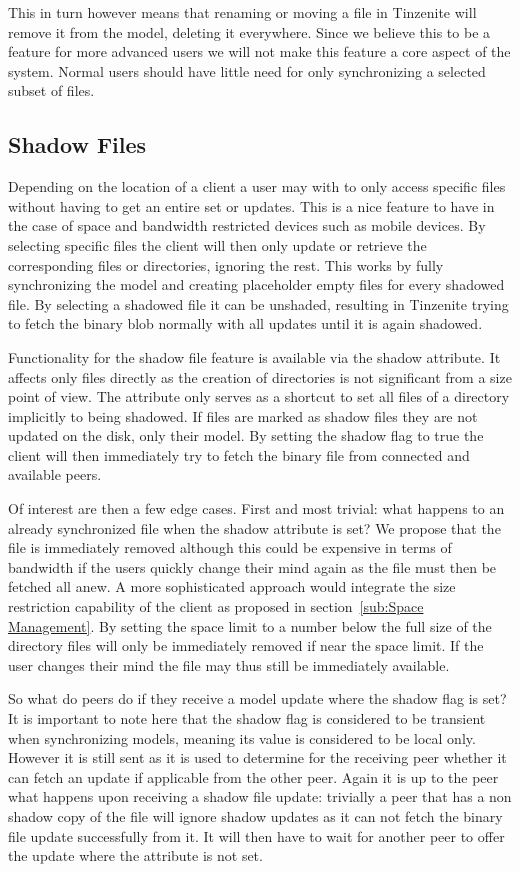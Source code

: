 This in turn however means that renaming or moving a file in Tinzenite will remove it from the model, deleting it everywhere.
Since we believe this to be a feature for more advanced users we will not make this feature a core aspect of the system.
Normal users should have little need for only synchronizing a selected subset of files.

\subsection{Shadow Files}
\label{sub:Shadow Files}

Depending on the location of a client a user may with to only access specific files without having to get an entire set or updates.
This is a nice feature to have in the case of space and bandwidth restricted devices such as mobile devices.
By selecting specific files the client will then only update or retrieve the corresponding files or directories, ignoring the rest.
This works by fully synchronizing the model and creating placeholder empty files for every shadowed file.
By selecting a shadowed file it can be unshaded, resulting in Tinzenite trying to fetch the binary blob normally with all updates until it is again shadowed.

Functionality for the shadow file feature is available via the shadow attribute.
It affects only files directly as the creation of directories is not significant from a size point of view.
The attribute only serves as a shortcut to set all files of a directory implicitly to being shadowed.
If files are marked as shadow files they are not updated on the disk, only their model.
By setting the shadow flag to true the client will then immediately try to fetch the binary file from connected and available peers.

Of interest are then a few edge cases.
First and most trivial: what happens to an already synchronized file when the shadow attribute is set?
We propose that the file is immediately removed although this could be expensive in terms of bandwidth if the users quickly change their mind again as the file must then be fetched all anew.
A more sophisticated approach would integrate the size restriction capability of the client as proposed in section~\ref{sub:Space Management}.
By setting the space limit to a number below the full size of the directory files will only be immediately removed if near the space limit.
If the user changes their mind the file may thus still be immediately available.

So what do peers do if they receive a model update where the shadow flag is set?
It is important to note here that the shadow flag is considered to be transient when synchronizing models, meaning its value is considered to be local only.
However it is still sent as it is used to determine for the receiving peer whether it can fetch an update if applicable from the other peer.
Again it is up to the peer what happens upon receiving a shadow file update: trivially a peer that has a non shadow copy of the file will ignore shadow updates as it can not fetch the binary file update successfully from it.
It will then have to wait for another peer to offer the update where the attribute is not set.

